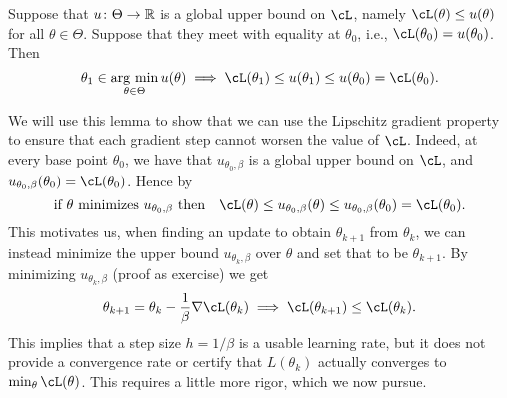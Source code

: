 \documentclass[../../book-main.tex]{subfiles}
\begin{document}
\begin{lemma}\label{lem:majorization_minimization}
    Suppose that \(u \colon \Theta \to \mathbb{R}\) is a global upper bound on \(\cL\), namely \(\cL(\theta) \leq u(\theta)\) for all \(\theta \in \Theta\). Suppose that they meet with equality at \(\theta_{0}\), i.e., \(\cL(\theta_{0}) = u(\theta_{0})\). Then
    \begin{equation}
        \theta_{1} \in \argmin_{\theta \in \Theta}u(\theta) \implies \cL(\theta_{1}) \leq u(\theta_{1}) \leq u(\theta_{0}) = \cL(\theta_{0}).
    \end{equation}
\end{lemma}

We will use this lemma to show that we can use the Lipschitz gradient property to ensure that each gradient step cannot worsen the value of \(\cL\). Indeed, at every base point \(\theta_{0}\), we have that \(u_{\theta_{0}, \beta}\) is a global upper bound on \(\cL\), and \(u_{\theta_{0}, \beta}(\theta_{0}) = \cL(\theta_{0})\). Hence by 
\begin{equation}
    \text{if \(\theta\) minimizes \(u_{\theta_{0}, \beta}\) then} \quad \cL(\theta) \leq u_{\theta_{0}, \beta}(\theta) \leq u_{\theta_{0}, \beta}(\theta_{0}) = \cL(\theta_{0}).
\end{equation}
This motivates us, when finding an update to obtain \(\theta_{k + 1}\) from \(\theta_{k}\), we can instead minimize the upper bound \(u_{\theta_{k}, \beta}\) over \(\theta\) and set that to be \(\theta_{k + 1}\). By minimizing \(u_{\theta_{k}, \beta}\) (proof as exercise) we get 
\begin{equation}\label{eq:GD}
    \theta_{k + 1} = \theta_{k} - \frac{1}{\beta}\nabla \cL(\theta_{k}) \implies \cL(\theta_{k + 1}) \leq \cL(\theta_{k}).
\end{equation}
This implies that a step size \(h = 1/\beta\) is a usable learning rate, but it does not provide a convergence rate or certify that \(L(\theta_{k})\) actually converges to \(\min_{\theta}\cL(\theta)\). This requires a little more rigor, which we now pursue.
\end{document}
